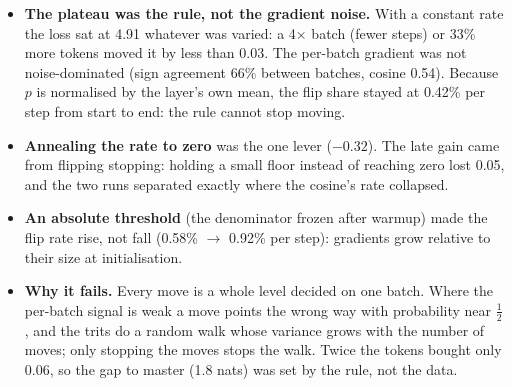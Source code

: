 \documentclass[10pt,twocolumn]{article}
\begin{document}
\begin{table}[t]
\centering
\caption{Stochastic flips from the gradient (110M, 300M tokens, 32768 tokens per step; training-time loss, the earlier
configuration; master in this configuration 2.759).}
\label{tab:stateless}
\end{table}

\begin{itemize}
\item \textbf{The plateau was the rule, not the gradient noise.} With a constant rate the loss sat at 4.91 whatever was
  varied: a 4$\times$ batch (fewer steps) or 33\% more tokens moved it by less than 0.03. The per-batch gradient was not
  noise-dominated (sign agreement 66\% between batches, cosine 0.54). Because $p$ is normalised by the layer's own mean,
  the flip share stayed at 0.42\% per step from start to end: the rule cannot stop moving.
\item \textbf{Annealing the rate to zero} was the one lever ($-0.32$). The late gain came from flipping stopping:
  holding a small floor instead of reaching zero lost 0.05, and the two runs separated exactly where the cosine's rate
  collapsed.
\item \textbf{An absolute threshold} (the denominator frozen after warmup) made the flip rate rise, not fall (0.58\%
  $\to$ 0.92\% per step): gradients grow relative to their size at initialisation.
\item \textbf{Why it fails.} Every move is a whole level decided on one batch. Where the per-batch signal is weak a move
  points the wrong way with probability near $\tfrac12$, and the trits do a random walk whose variance grows with the
  number of moves; only stopping the moves stops the walk. Twice the tokens bought only 0.06, so the gap to master (1.8
  nats) was set by the rule, not the data.
\end{itemize}
\end{document}

